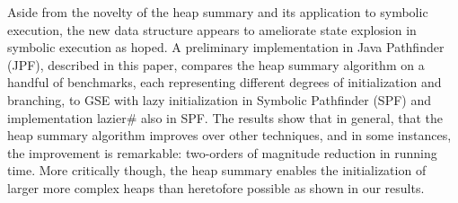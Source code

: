 Aside from the novelty of the heap summary and its application to
symbolic execution, the new data structure appears to ameliorate state
explosion in symbolic execution as hoped. A preliminary implementation in Java
Pathfinder (JPF), described in this paper, compares the heap summary
algorithm on a handful of benchmarks, each representing different
degrees of initialization and branching, to GSE with lazy
initialization in Symbolic Pathfinder (SPF) and implementation
lazier\# also in SPF. The results show that in general, that the heap
summary algorithm improves over other techniques, and in some
instances, the improvement is remarkable: two-orders of magnitude
reduction in running time. More critically though, the heap summary
enables the initialization of larger more complex heaps than
heretofore possible as shown in our results.



\begin{comment}
We implement the summary heap algorithm as an extension to \emph{Java
  PathFinder} (JPF) and compare it to GSE with lazy initialization in
\emph{Symbolic Pathfinder (SPF)} and an implementation of lazier\#
initialization in SPF.  The comparison shows on some examples up to a two-order of magnitude
reduction in the total time taken to explore the same state space
defined by the bound on the longest heap reference chain.  For these
examples, we show that where other GSE approaches are unable to
complete exploration within the provided time bound, the summary heap
finishes exploration in a few seconds.
\end{comment}





